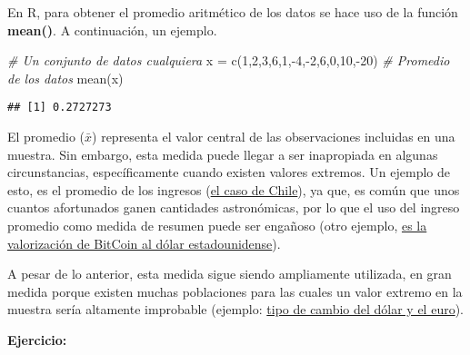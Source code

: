 \documentclass[
]{book}
\newenvironment{Shaded}{\begin{snugshade}}{\end{snugshade}}
\newcommand{\CommentTok}[1]{\textcolor[rgb]{0.56,0.35,0.01}{\textit{#1}}}
\newcommand{\DecValTok}[1]{\textcolor[rgb]{0.00,0.00,0.81}{#1}}
\newcommand{\FunctionTok}[1]{\textcolor[rgb]{0.00,0.00,0.00}{#1}}
\newcommand{\NormalTok}[1]{#1}
\newcommand{\OtherTok}[1]{\textcolor[rgb]{0.56,0.35,0.01}{#1}}
\newcommand{\SpecialCharTok}[1]{\textcolor[rgb]{0.00,0.00,0.00}{#1}}
\begin{document}
En R, para obtener el promedio aritmético de los datos se hace uso de la función \textbf{mean()}. A continuación, un ejemplo.

\begin{Shaded}
\begin{Highlighting}[]
\CommentTok{\# Un conjunto de datos cualquiera}
\NormalTok{x }\OtherTok{=} \FunctionTok{c}\NormalTok{(}\DecValTok{1}\NormalTok{,}\DecValTok{2}\NormalTok{,}\DecValTok{3}\NormalTok{,}\DecValTok{6}\NormalTok{,}\DecValTok{1}\NormalTok{,}\SpecialCharTok{{-}}\DecValTok{4}\NormalTok{,}\SpecialCharTok{{-}}\DecValTok{2}\NormalTok{,}\DecValTok{6}\NormalTok{,}\DecValTok{0}\NormalTok{,}\DecValTok{10}\NormalTok{,}\SpecialCharTok{{-}}\DecValTok{20}\NormalTok{)}
\CommentTok{\# Promedio de los datos}
\FunctionTok{mean}\NormalTok{(x)}
\end{Highlighting}
\end{Shaded}

\begin{verbatim}
## [1] 0.2727273
\end{verbatim}

El promedio (\(\bar{x}\)) representa el valor central de las observaciones incluidas en una muestra. Sin embargo, esta medida puede llegar a ser inapropiada en algunas circunstancias, específicamente cuando existen valores extremos. Un ejemplo de esto, es el promedio de los ingresos (\href{https://www.ine.gob.cl/prensa/detalle-prensa/2022/07/21/el-ingreso-laboral-promedio-mensual-en-chile-fue-de-$681.039-en-2021\#:~:text=El\%20ingreso\%20laboral\%20promedio\%20mensual\%20en\%20Chile\%20fue\%20de\%20\%24681.039\%20en\%202021,-21\%2F07\%2F2022\&text=El\%2050\%25\%20de\%20las\%20personas,ingreso\%20de\%20hasta\%20\%24457.690\%20mensuales.}{el caso de Chile}), ya que, es común que unos cuantos afortunados ganen cantidades astronómicas, por lo que el uso del ingreso promedio como medida de resumen puede ser engañoso (otro ejemplo, \href{https://www.google.com/finance/quote/BTC-USD?sa=X\&ved=2ahUKEwi3po-_m9n8AhWUL7kGHTNFCfYQ-fUHegQIFhAe\&window=MAX}{es la valorización de BitCoin al dólar estadounidense}).

A pesar de lo anterior, esta medida sigue siendo ampliamente utilizada, en gran medida porque existen muchas poblaciones para las cuales un valor extremo en la muestra sería altamente improbable (ejemplo: \href{https://www.google.com/finance/quote/EUR-CLP?window=MAX\&comparison=USD-CLP}{tipo de cambio del dólar y el euro}).

\textbf{Ejercicio:}
\end{document}
